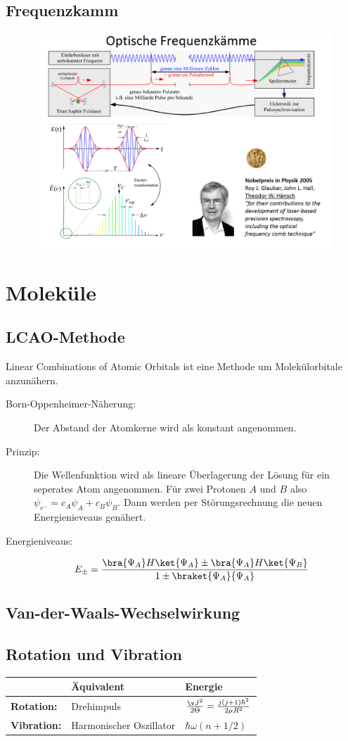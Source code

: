 \documentclass[twocolumn]{summery_4.1}
\begin{document}
\subsection{Frequenzkamm}
\begin{figure}[H]
    \centering
    \includegraphics[width=.49\textwidth]{Frequenzkamm.png}
\end{figure}

\section{Moleküle}
\subsection{LCAO-Methode}
{\large L}inear {\large C}ombinations of {\large Atomic} {\large O}rbitals ist eine Methode um Molekülorbitale anzunähern.
\begin{description}
    \item[Born-Oppenheimer-Näherung:] Der Abstand der Atomkerne wird als konstant angenommen.
    \item[Prinzip:] Die Wellenfunktion wird als lineare Überlagerung der Lösung für ein seperates Atom angenommen. Für zwei Protonen \(A\) und \(B\) also \(\psi_{e^-} = c_A\psi_A + c_B \psi_B\). Dann werden per Störungsrechnung die neuen Energienieveaus genähert.
    \item[Energieniveaus:]
    \begin{align*}
        E_\pm &= \frac{\bra{\Psi_A}H\ket{\Psi_A} \pm \bra{\Psi_A}H\ket{\Psi_B}}{1\pm \braket{\Psi_A}{\Psi_A}}
    \end{align*} 
\end{description}

\subsection{Van-der-Waals-Wechselwirkung}

\subsection{Rotation und Vibration}
\begin{center}
\begin{tabular}[0.49\textwidth]{@{}lll@{}}
    \toprule
    & Äquivalent & Energie \\
    \midrule
    {\bf Rotation:} & Drehimpuls & \(\frac{\v J^2}{2\Theta} = \frac{j(j+1)\hbar^2}{2\mu R^2}\)\\
    {\bf Vibration:} & Harmonischer Oszillator & \(\hbar\omega(n+1/2)\)\\
    \bottomrule
\end{tabular}
\end{center}
\end{document}
